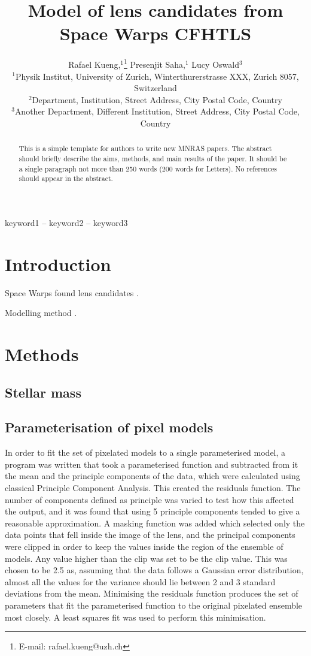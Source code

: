 \documentclass[fleqn,usenatbib]{mnras}
\title[Short title, max. 45 characters]{Model of lens candidates from
  Space Warps CFHTLS}
\author[R. Kueng et al.]{
Rafael Kueng,$^{1}$\thanks{E-mail: rafael.kueng@uzh.ch}
Presenjit Saha,$^{1}$
Lucy Oswald$^{3}$
\\
$^{1}$Physik Institut, University of Zurich, Winterthurerstrasse XXX, Zurich 8057, Switzerland\\
$^{2}$Department, Institution, Street Address, City Postal Code, Country\\
$^{3}$Another Department, Different Institution, Street Address, City Postal Code, Country
}
\begin{document}
\label{firstpage}
\pagerange{\pageref{firstpage}--\pageref{lastpage}}
\maketitle

\begin{abstract}
This is a simple template for authors to write new MNRAS papers.
The abstract should briefly describe the aims, methods, and main results of the paper.
It should be a single paragraph not more than 250 words (200 words for Letters).
No references should appear in the abstract.
\end{abstract}

\begin{keywords}
keyword1 -- keyword2 -- keyword3
\end{keywords}

\section{Introduction}

Space Warps \citep{2016MNRAS.455.1171M} found lens candidates
\citep{2016MNRAS.455.1191M}.

Modelling method \citep{2015MNRAS.447.2170K}.

\section{Methods}

\subsection{Stellar mass}

\subsection{Parameterisation of pixel models} \label{sec:parameter}
In order to fit the set of pixelated models to a single parameterised model, a program was written that took a parameterised function and subtracted from it the mean and the principle components of the data, which were calculated using classical Principle Component Analysis.
This created the residuals function.
The number of components defined as principle was varied to test how this affected the output, and it was found that using 5 principle components tended to give a reasonable approximation.
A masking function was added which selected only the data points that fell inside the image of the lens, and the principal components were clipped in order to keep the values inside the region of the ensemble of models.
Any value higher than the clip was set to be the clip value.
This was chosen to be 2.5 as, assuming that the data follows a Gaussian error distribution, almost all the values for the variance should lie between 2 and 3 standard deviations from the mean.
Minimising the residuals function produces the set of parameters that fit the parameterised function to the original pixelated ensemble most closely.
A least squares fit was used to perform this minimisation.
\end{document}
